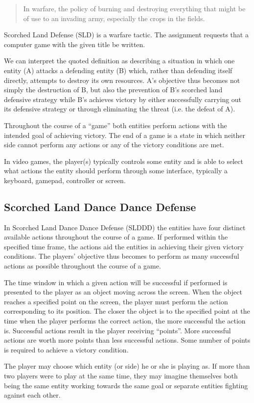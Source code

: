 \begin{quote}
	In warfare, the policy of burning and destroying everything that might be of use to an invading army, especially the crops in the fields.\cite{lab-compendium}
\end{quote}
Scorched Land Defense (SLD) is a warfare tactic. The assignment requests that a computer game with the given title be written.

We can interpret the quoted definition as describing a situation in which one entity (A) attacks a defending entity (B) which, rather than defending itself directly, attempts to destroy its own resources.
A's objective thus becomes not simply the destruction of B, but also the prevention of B's scorched land defensive strategy while B's achieves victory by either successfully carrying out its defensive strategy or through eliminating the threat (i.e. the defeat of A).

Throughout the course of a ``game'' both entities perform actions with the intended goal of achieving victory.
The end of a game is a state in which neither side cannot perform any actions or any of the victory conditions are met.

In video games, the player(s) typically controls some entity and is able to select what actions the entity should perform through some interface, typically a keyboard, gamepad, controller or screen.

\subsection{Scorched Land Dance Dance Defense}
In Scorched Land Dance Dance Defense (SLDDD) the entities have four distinct available actions throughout the course of a game.
If performed within the specified time frame, the actions aid the entities in achieving their given victory conditions.
The players' objective thus becomes to perform as many successful actions as possible throughout the course of a game.

The time window in which a given action will be successful if performed is presented to the player as an object moving across the screen.
When the object reaches a specified point on the screen, the player must perform the action corresponding to its position.
The closer the object is to the specified point at the time when the player performs the correct action, the more successful the action is.
Successful actions result in the player receiving ``points''.
More successful actions are worth more points than less successful actions.
Some number of points is required to achieve a victory condition.

The player may choose which entity (or side) he or she is playing as.
If more than two players were to play at the same time, they may imagine themselves both being the same entity working towards the same goal or separate entities fighting against each other.

